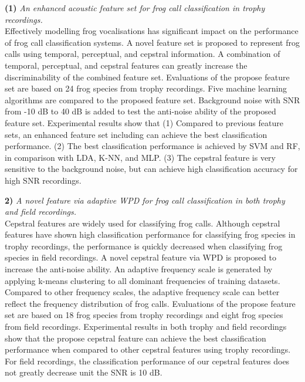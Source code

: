 \textbf{(1)} \textit{An enhanced acoustic feature set for frog call classification in trophy recordings.} 
\\
Effectively modelling frog vocalisations has significant impact on the performance of frog call classification systems. A novel feature set is proposed to represent frog calls using temporal, perceptual, and cepstral information. A combination of temporal, perceptual, and cepstral features can greatly increase the discriminability of the combined feature set. Evaluations of the propose feature set are based on 24 frog species from trophy recordings. Five machine learning algorithms are compared to the proposed feature set. Background noise with SNR from -10 dB to 40 dB is added to test the anti-noise ability of the proposed feature set. Experimental results show that (1) Compared to previous feature sets, an enhanced feature set including  can achieve the best classification performance. (2) The best classification performance is achieved by SVM and RF, in comparison with LDA, K-NN, and MLP. (3) The cepstral feature is very sensitive to the background noise, but can achieve high classification accuracy for high SNR recordings. 

\textbf{2)} \textit{A novel feature via adaptive WPD for frog call classification in both trophy and field recordings.}
\\
Cepstral features are widely used for classifying frog calls. Although cepstral features have shown high classification performance for classifying frog species in trophy recordings, the performance is quickly decreased when classifying frog species in field recordings. A novel cepstral feature via WPD is proposed to increase the anti-noise ability. An adaptive frequency scale is generated by applying k-means clustering to all dominant frequencies of training datasets. Compared to other frequency scales, the adaptive frequency scale can better reflect the frequency distribution of frog calls. Evaluations of the propose feature set are based on 18 frog species from trophy recordings and eight frog species from field recordings. Experimental results in both trophy and field recordings show that the propose cepstral feature can achieve the best classification performance when compared to other cepstral features using trophy recordings. For field recordings, the classification performance of our cepstral features does not greatly decrease unit the SNR is 10 dB.



